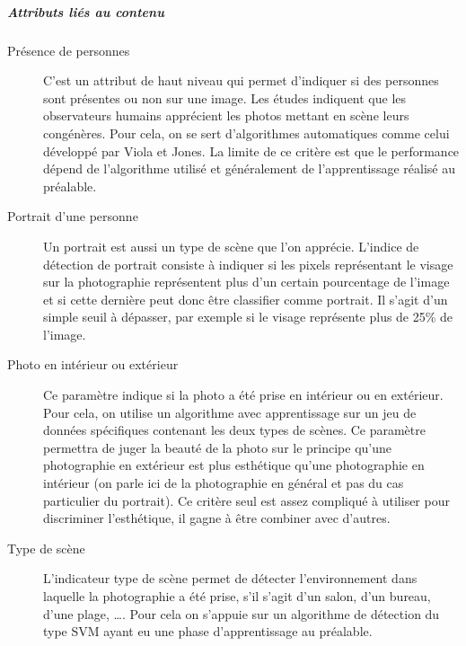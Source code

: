 \documentclass[11pt, french]{report-rd-info}
\begin{document}
\subparagraph{Attributs liés au contenu}
\begin{description}
\item[Présence de personnes]
C’est un attribut de haut niveau qui permet d’indiquer si des personnes sont présentes ou non sur une image. Les études indiquent que les observateurs humains apprécient les photos mettant en scène leurs congénères. Pour cela, on se sert d’algorithmes automatiques comme celui développé par Viola et Jones. La limite de ce critère est que le performance dépend de l’algorithme utilisé et généralement de l’apprentissage réalisé au préalable.
\item[Portrait d'une personne]
Un portrait est aussi un type de scène que l’on apprécie. L’indice de détection de portrait consiste à indiquer si les pixels représentant le visage sur la photographie représentent plus d’un certain pourcentage de l’image et si cette dernière peut donc être classifier comme portrait. Il s’agit d’un simple seuil à dépasser, par exemple si le visage représente plus de 25\% de l’image.
\item[Photo en intérieur ou extérieur]
Ce paramètre indique si la photo a été prise en intérieur ou en extérieur. Pour cela, on utilise un algorithme avec apprentissage sur un jeu de données spécifiques contenant les deux types de scènes. Ce paramètre permettra de juger la beauté de la photo sur le principe qu’une photographie en extérieur est plus esthétique qu’une photographie en intérieur (on parle ici de la photographie en général et pas du cas particulier du portrait). Ce critère seul est assez compliqué à utiliser pour discriminer l’esthétique, il gagne à être combiner avec d’autres.
\item[Type de scène]
L’indicateur type de scène permet de détecter l’environnement dans laquelle la photographie a été prise, s’il s’agit d’un salon, d’un bureau, d’une plage, \ldots. Pour cela on s’appuie sur un algorithme de détection du type SVM ayant eu une phase d’apprentissage au préalable.
\end{description}
\end{document}
